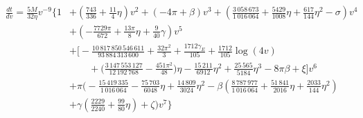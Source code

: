 % 
% 
{\footnotesize{\allowdisplaybreaks\begin{align}\label{eq:T2time}
\frac{dt}{dv} = \frac{5 M}{32 \eta} v^{-9} \Bigg\{
1 &+ 
\left(\frac{743}{336} + \frac{11}{4} \eta \right) v^2
+ \left( -4 \pi + \beta \right) v^3
+ \left( \frac{3\,058\,673}{1\,016\,064} + \frac{5429}{1008} \eta + \frac{617}{144} \eta^2 - \sigma \right) v^4
\nonumber \\
&+ \left( -\frac{7729 \pi}{672} + \frac{13 \pi}{8} \eta + \frac{9}{40} \gamma \right) v^5
\nonumber \\
&+ \Bigg[ -\frac{10\,817\,850\,546\,611}{93\,884\,313\,600} + \frac{32 \pi^2}{3} + \frac{1712 \gamma_E}{105} + \frac{1712}{105} \log (4 v)
\nonumber \\
&  \qquad + \Big(\frac{3\,147\,553\,127}{12\,192\,768} - \frac{451 \pi^2}{48} \Big) \eta - \frac{15\,211}{6912} \eta^2 
+ \frac{25\,565}{5184} \eta^3 - 8 \pi \beta + \xi \Bigg] v^6 \nonumber \\
&+ \pi \Bigg( -\frac{15\,419\,335}{1\,016\,064} -\frac{75\,703}{6048} \eta + \frac{14\,809}{3024} \eta^2 
- \beta \left( \frac{8\,787\,977}{1\,016\,064} + \frac{51\,841}{2016}\eta + \frac{2033}{144}\eta^2 \right) \nonumber \\
&+ \gamma \left( \frac{2229}{2240} + \frac{99}{80}\eta \right) + \zeta \Bigg) v^7
\Bigg\}
\end{align}}}



